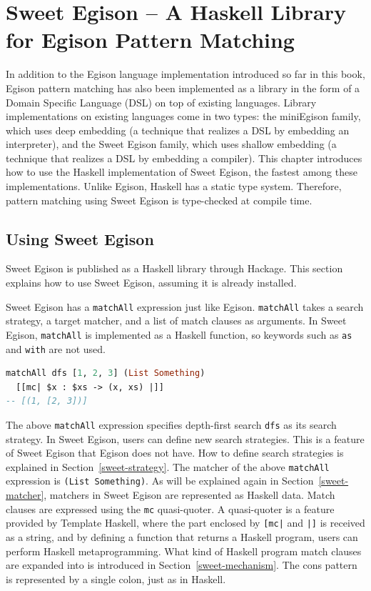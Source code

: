 \chapter{Sweet Egison -- A Haskell Library for Egison Pattern Matching}\label{sweet}

In addition to the Egison language implementation introduced so far in this book, Egison pattern matching has also been implemented as a library in the form of a Domain Specific Language (DSL) on top of existing languages.
Library implementations on existing languages come in two types: the miniEgison family, which uses deep embedding (a technique that realizes a DSL by embedding an interpreter), and the Sweet Egison family, which uses shallow embedding (a technique that realizes a DSL by embedding a compiler).
This chapter introduces how to use the Haskell implementation of Sweet Egison, the fastest among these implementations.
Unlike Egison, Haskell has a static type system.
Therefore, pattern matching using Sweet Egison is type-checked at compile time.

\section{Using Sweet Egison}\label{sweet-match}

Sweet Egison is published as a Haskell library through Hackage.
This section explains how to use Sweet Egison, assuming it is already installed.

Sweet Egison has a \lstinline{matchAll} expression just like Egison.
\lstinline{matchAll} takes a search strategy, a target matcher, and a list of match clauses as arguments.
In Sweet Egison, \lstinline{matchAll} is implemented as a Haskell function, so keywords such as \lstinline{as} and \lstinline{with} are not used.
\begin{lstlisting}[language=haskell,numbers=none]
matchAll dfs [1, 2, 3] (List Something)
  [[mc| $x : $xs -> (x, xs) |]]
-- [(1, [2, 3])]
\end{lstlisting}
The above \lstinline{matchAll} expression specifies depth-first search \lstinline{dfs} as its search strategy.
In Sweet Egison, users can define new search strategies.
This is a feature of Sweet Egison that Egison does not have.
How to define search strategies is explained in Section~\ref{sweet-strategy}.
The matcher of the above \lstinline{matchAll} expression is \lstinline{(List Something)}.
As will be explained again in Section~\ref{sweet-matcher}, matchers in Sweet Egison are represented as Haskell data.
Match clauses are expressed using the \lstinline{mc} quasi-quoter.
A quasi-quoter is a feature provided by Template Haskell, where the part enclosed by \lstinline{[mc|} and \lstinline{|]} is received as a string, and by defining a function that returns a Haskell program, users can perform Haskell metaprogramming.
What kind of Haskell program match clauses are expanded into is introduced in Section~\ref{sweet-mechanism}.
The cons pattern is represented by a single colon, just as in Haskell.

